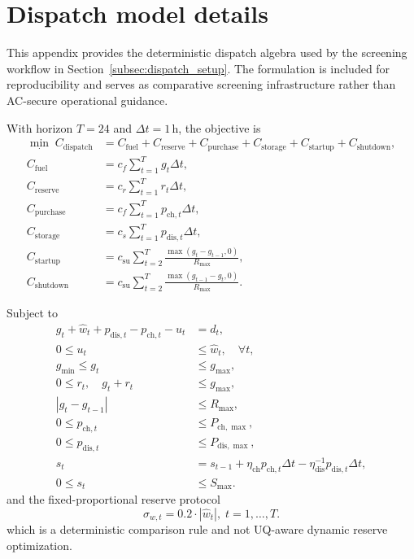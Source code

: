 ﻿\documentclass[review,1p,times]{elsarticle}
\begin{document}
\section{Dispatch model details}\label{app:dispatch_details}
This appendix provides the deterministic dispatch algebra used by the screening workflow in Section~\ref{subsec:dispatch_setup}. The formulation is included for reproducibility and serves as comparative screening infrastructure rather than AC-secure operational guidance.

With horizon $T=24$ and $\Delta t=1$\,h, the objective is
\begin{align}
\min_{\cdot}\; C_{\text{dispatch}} &= C_{\text{fuel}} + C_{\text{reserve}} + C_{\text{purchase}} + C_{\text{storage}} + C_{\text{startup}} + C_{\text{shutdown}}, \label{eq:app_dispatch_obj}\\
C_{\text{fuel}} &= c_f\sum_{t=1}^{T} g_t\Delta t, \nonumber\\
C_{\text{reserve}} &= c_r\sum_{t=1}^{T} r_t\Delta t, \nonumber\\
C_{\text{purchase}} &= c_f\sum_{t=1}^{T} p_{\text{ch},t}\Delta t, \nonumber\\
C_{\text{storage}} &= c_s\sum_{t=1}^{T} p_{\text{dis},t}\Delta t, \nonumber\\
C_{\text{startup}} &= c_{\text{su}}\sum_{t=2}^{T}\frac{\max(g_t-g_{t-1},0)}{R_{\max}}, \nonumber\\
C_{\text{shutdown}} &= c_{\text{su}}\sum_{t=2}^{T}\frac{\max(g_{t-1}-g_t,0)}{R_{\max}}. \nonumber
\end{align}

Subject to
\begin{align}
g_t + \hat{w}_t + p_{\text{dis},t} - p_{\text{ch},t} - u_t &= d_t, \label{eq:app_dispatch_balance}\\
0\le u_t &\le \hat{w}_t,\quad \forall t, \nonumber\\
g_{\min}\le g_t &\le g_{\max}, \label{eq:app_dispatch_gen}\\
0\le r_t, \quad g_t+r_t &\le g_{\max}, \nonumber\\
|g_t-g_{t-1}| &\le R_{\max}, \nonumber\\
0\le p_{\text{ch},t} &\le P_{\text{ch},\max}, \label{eq:app_dispatch_storage_power}\\
0\le p_{\text{dis},t} &\le P_{\text{dis},\max}, \nonumber\\
s_t &= s_{t-1} + \eta_{\text{ch}}p_{\text{ch},t}\Delta t - \eta_{\text{dis}}^{-1}p_{\text{dis},t}\Delta t, \label{eq:app_dispatch_storage_soc}\\
0\le s_t &\le S_{\max}. \nonumber
\end{align}
and the fixed-proportional reserve protocol
\begin{equation}
\sigma_{w,t}=0.2\cdot|\hat{w}_t|,\; t=1,\ldots,T.
\end{equation}
which is a deterministic comparison rule and not UQ-aware dynamic reserve optimization.
\end{document}
